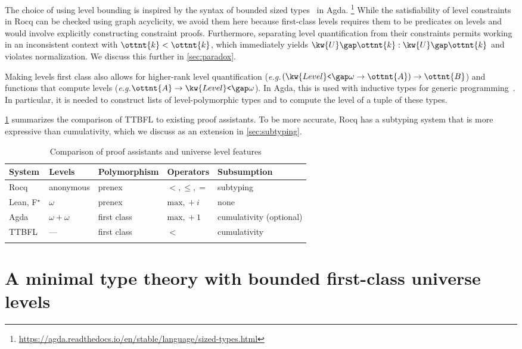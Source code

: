 \documentclass[a4paper,UKenglish,cleveref,autoref,thm-restate]{lipics-v2021}
\makeatletter
\newcommand{\citep}[1]{\cite{#1}}
\newcommand{\lang}{TTBFL\@\xspace}
\newcommand{\eg}{\textit{e.g.}\@\xspace}
\newcommand{\fstar}{F$^\star$\@\xspace}
\makeatother
\begin{document}
The choice of using level bounding is inspired by
the syntax of bounded sized types~\citep{sized} in Agda.%
\footnote{\url{https://agda.readthedocs.io/en/stable/language/sized-types.html}}
While the satisfiability of level constraints in Rocq can be checked using graph acyclicity,
we avoid them here because first-class levels requires them to be predicates on levels
and would involve explicitly constructing constraint proofs.
Furthermore, separating level quantification from their constraints
permits working in an inconsistent context with $\ottnt{k} < \ottnt{k}$,
which immediately yields $ \kw{U} \gap  \ottnt{k}  :  \kw{U} \gap  \ottnt{k} $ and violates normalization.
We discuss this further in \cref{sec:paradox}.

Making levels first class also allows for higher-rank level quantification
(\eg $  (   \kw{Level}\texttt{<} \gap   \omega    \to  \ottnt{A}  )   \to  \ottnt{B} $)
and functions that compute levels (\eg $ \ottnt{A}  \to   \kw{Level}\texttt{<} \gap   \omega   $).
In Agda, this is used with inductive types for generic programming~\citep{generic}.
In particular, it is needed to construct lists of level-polymorphic types
and to compute the level of a tuple of these types.

\cref{tab:comparison} summarizes the comparison of \lang to existing proof assistants.
To be more accurate, Rocq has a subtyping system that is more expressive than cumulativity,
which we discuss as an extension in \cref{sec:subtyping}.

\begin{table}[h]
\begin{tabular}{lllll}
  \toprule
  System & Levels & Polymorphism & Operators & Subsumption \\
  \midrule
  Rocq & anonymous & prenex & $<, \le, =$ & subtyping \\
  Lean, \fstar & $\omega$ & prenex & $\mathrm{max}, {} + i$ & none \\
  Agda & $\omega + \omega$ & first class & $\mathrm{max}, {} + 1$ & cumulativity (optional) \\
  \lang & --- & first class & $<$ & cumulativity \\
  \bottomrule \\
\end{tabular}
\caption{Comparison of proof assistants and universe level features}
\label{tab:comparison}
\end{table}

\section{A minimal type theory with bounded first-class universe levels} \label{sec:ttbfl}
\end{document}
